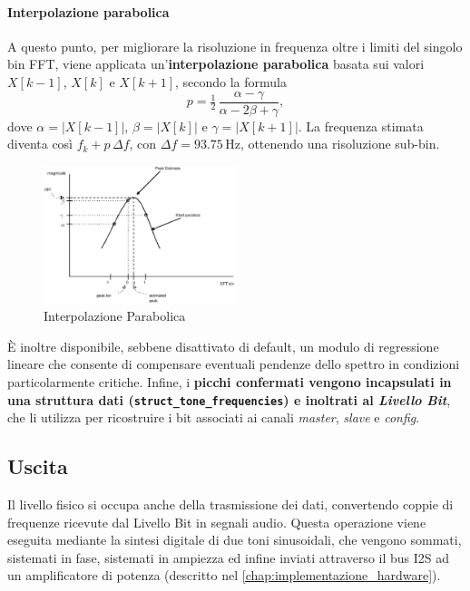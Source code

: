 \paragraph{Interpolazione parabolica}
\label{par: interpolazione_parabolica}
 A questo punto, per migliorare 
 la risoluzione in frequenza oltre i limiti del singolo bin FFT, viene applicata un’\textbf{interpolazione parabolica} basata
  sui valori $X[k-1]$, $X[k]$ e $X[k+1]$, secondo la formula
\[
p = \tfrac{1}{2}\,\frac{\alpha - \gamma}{\alpha - 2\beta + \gamma},
\]
dove $\alpha = |X[k-1]|$, $\beta = |X[k]|$ e $\gamma = |X[k+1]|$. La frequenza stimata diventa così $f_k + p\,\Delta f$, con $\Delta f = 93.75\,\text{Hz}$, 
ottenendo una risoluzione sub-bin.\\ 
\begin{figure}[H]
    \centering
    \includegraphics[width=0.5\textwidth]{immagini/parabolic_interpolation.png}
    \caption{Interpolazione Parabolica \citep{QuadraticInterpolationSpectralPeaks}}
    \label{fig:interpolazione_parabolica}
\end{figure}
È inoltre disponibile, sebbene disattivato di default, un modulo di regressione lineare che consente di compensare eventuali 
pendenze dello spettro in condizioni particolarmente critiche. Infine, i \textbf{picchi confermati vengono incapsulati in una struttura dati (\texttt{struct\_tone\_frequencies})
 e inoltrati al \emph{Livello Bit}}, che li utilizza per ricostruire i bit associati ai canali \emph{master}, \emph{slave} e \emph{config}.
\subsection{Uscita}
\label{sec:uscita_livello_fisico}
Il livello fisico si occupa anche della trasmissione dei dati, convertendo coppie di frequenze ricevute dal Livello Bit in segnali audio.
Questa operazione viene eseguita mediante la sintesi digitale di due toni sinusoidali, che vengono sommati, sistemati in fase, sistemati in ampiezza
ed infine inviati attraverso il bus I2S ad un amplificatore di potenza (descritto nel \autoref{chap:implementazione_hardware}).

